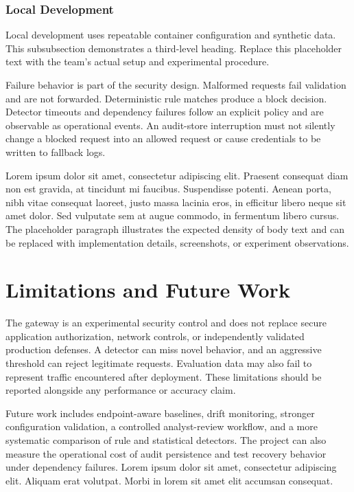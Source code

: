 \documentclass[conference]{IEEEtran}
\begin{document}
\subsubsection{Local Development}
Local development uses repeatable container configuration and synthetic data.
This subsubsection demonstrates a third-level heading. Replace this placeholder
text with the team's actual setup and experimental procedure.

Failure behavior is part of the security design. Malformed requests fail
validation and are not forwarded. Deterministic rule matches produce a block
decision. Detector timeouts and dependency failures follow an explicit policy
and are observable as operational events. An audit-store interruption must not
silently change a blocked request into an allowed request or cause credentials
to be written to fallback logs.

Lorem ipsum dolor sit amet, consectetur adipiscing elit. Praesent consequat
diam non est gravida, at tincidunt mi faucibus. Suspendisse potenti. Aenean
porta, nibh vitae consequat laoreet, justo massa lacinia eros, in efficitur
libero neque sit amet dolor. Sed vulputate sem at augue commodo, in fermentum
libero cursus. The placeholder paragraph illustrates the expected density of
body text and can be replaced with implementation details, screenshots, or
experiment observations.

\section{Limitations and Future Work}
The gateway is an experimental security control and does not replace secure
application authorization, network controls, or independently validated
production defenses. A detector can miss novel behavior, and an aggressive
threshold can reject legitimate requests. Evaluation data may also fail to
represent traffic encountered after deployment. These limitations should be
reported alongside any performance or accuracy claim.

Future work includes endpoint-aware baselines, drift monitoring, stronger
configuration validation, a controlled analyst-review workflow, and a more
systematic comparison of rule and statistical detectors. The project can also
measure the operational cost of audit persistence and test recovery behavior
under dependency failures. Lorem ipsum dolor sit amet, consectetur adipiscing
elit. Aliquam erat volutpat. Morbi in lorem sit amet elit accumsan consequat.
\end{document}

